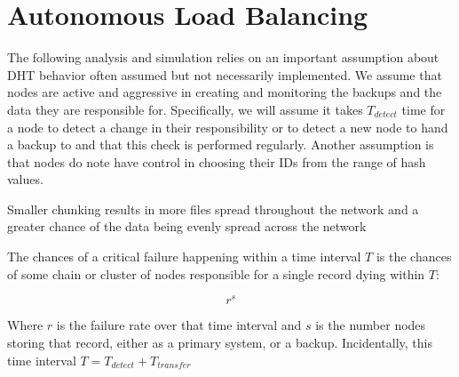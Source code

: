 \chapter{Autonomous Load Balancing}
\label{chapter:auto-balance}



The following analysis and simulation relies on an important assumption about DHT behavior often assumed but not necessarily implemented.
We assume that nodes are active and aggressive in creating and monitoring the backups and the data they are responsible for.
Specifically, we will assume  it takes  $T_{detect}$ time for a node to detect a change in their responsibility or to detect a new node to hand a backup to and that this check is performed regularly.
Another assumption is that nodes do note have control in choosing their IDs from the range of hash values.

Smaller chunking results in more files spread throughout the  network and a greater chance of the data being evenly spread across the network 

The chances of a critical failure happening within a time interval $ T $ is the chances of some chain or cluster of nodes responsible for a single record dying within $ T $:

$$r^{s}$$

Where $ r $ is the failure rate over that time interval and $s$ is the number nodes storing that record, either as a primary system, or a backup.
Incidentally, this time interval $T = T_{detect} + T_{transfer} $

